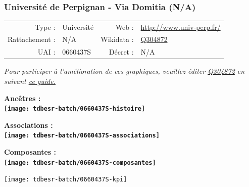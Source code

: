 \documentclass[12pt,french,]{article}
\begin{document}
\ifoddpage \fi ~\newpage  

\hypertarget{universituxe9-de-perpignan---via-domitia-na}{%
\subsubsection{Université de Perpignan - Via Domitia
(N/A)}\label{universituxe9-de-perpignan---via-domitia-na}}

\begin{tabular*}{\textwidth}{rp{5cm}rl}  
\hline  
Type : & Université & Web : &\href{http://www.univ-perp.fr/}{http://www.univ-perp.fr/} \\  
Rattachement : & N/A & Wikidata : & \href{https://www.wikidata.org/entity/Q304872}{Q304872} \\  
UAI : & 0660437S & Décret : & N/A \\  
\hline  
\end{tabular*}

\textit{\scriptsize Pour participer à l'amélioration de ces graphiques, veuillez éditer  \href{https://www.wikidata.org/entity/Q304872}{Q304872}  en suivant \href{https://github.com/cpesr/wikidataESR/blob/master/Rmd/wikidataESR.md}{ce guide.}}

\vspace{1cm}  
\begin{minipage}[b]{0.50\textwidth}\begin{center} \bf Ancêtres : \\  
\texttt{[image: tdbesr-batch/0660437S-histoire]} \end{center}\end{minipage}\begin{minipage}[b]{0.50\textwidth}\begin{center} \bf Associations : \\  
\texttt{[image: tdbesr-batch/0660437S-associations]} \end{center}\end{minipage}

\hrulefill

\begin{center} \bf Composantes : \\  
\texttt{[image: tdbesr-batch/0660437S-composantes]} \end{center}

\begin{center}\texttt{[image: tdbesr-batch/0660437S-kpi]} \end{center}\checkoddpage

\ifoddpage \fi ~\newpage  
\end{document}
